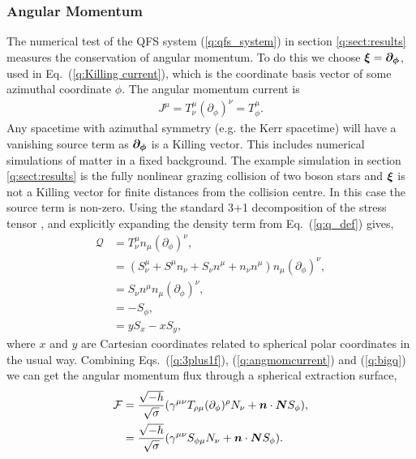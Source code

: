\subsubsection{Angular Momentum} \label{q:sect:angmom}
The numerical test of the QFS system (\ref{q:qfs_system}) in section \ref{q:sect:results} measures the conservation of angular momentum. To do this we choose $\boldsymbol{\xi} = \boldsymbol{\partial_\phi}$, used in Eq.~(\ref{q:Killing current}), which is the coordinate basis vector of some azimuthal coordinate $\phi$. The angular momentum current is
\begin{align}
\label{q:angmomcurrent} J^\mu = T^\mu_\nu (\partial_\phi)^\nu=T^\mu_\phi.
\end{align}
Any spacetime with azimuthal symmetry (e.g. the Kerr spacetime) will have a vanishing source term as $\boldsymbol{\partial_\phi}$ is a Killing vector. This includes numerical simulations of matter in a fixed background. The example simulation in section \ref{q:sect:results} is the fully nonlinear grazing collision of two boson stars and $\boldsymbol{\xi}$ is not a Killing vector for finite distances from the collision centre. In this case the source term is non-zero. Using the standard 3+1 decomposition of the stress tensor \cite{gourgoulhon20073+}, \cite{alcubierre2008introduction} and explicitly expanding the density term from Eq.~(\ref{q:q_def}) gives,
\begin{align}
 \label{q:q_def_angmom}\mathcal{Q} &= T^\mu_\nu n_\mu ({\partial_\phi})^\nu, \\
       &= (S^\mu_\nu + S^\mu n_\nu + S_\nu n^\mu + n_\nu n^\mu) n_\mu (\partial_\phi)^\nu, \\
       &=  S_\nu n^\mu  n_\mu (\partial_\phi)^\nu, \\
       \label{q:bigq}&= -S_\phi, \\
       \label{q:q_explicit}&= y S_x - x S_y,
\end{align}
where $x$ and $y$ are Cartesian coordinates related to spherical polar coordinates in the usual way. Combining Eqs.~(\ref{q:3plus1f}), (\ref{q:angmomcurrent}) and (\ref{q:bigq}) we can get the angular momentum flux through a spherical extraction surface,
\begin{align}
 \mathcal{F} &= \frac{\sqrt{-h}}{\sqrt{\sigma}} (\gamma^{\mu\nu} T_{\rho\mu} (\partial_\phi)^\rho N_\nu + \boldsymbol{n} \cdot \boldsymbol{N} S_\phi),\\
             &= \frac{\sqrt{-h}}{\sqrt{\sigma}} (\gamma^{\mu\nu} S_{\phi\mu} N_\nu + \boldsymbol{n} \cdot \boldsymbol{N} S_\phi).
\end{align}
